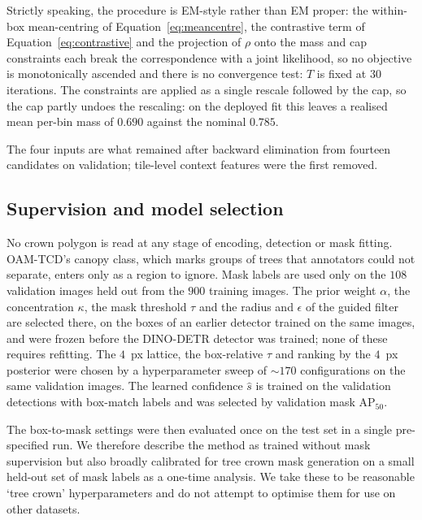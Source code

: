 \documentclass[remotesensing,article,submit,moreauthors]{Definitions/mdpi}
\begin{document}
Strictly speaking, the procedure is EM-style rather than EM proper: the within-box mean-centring of Equation~\eqref{eq:meancentre}, the contrastive term of Equation~\eqref{eq:contrastive} and the projection of $\rho$ onto the mass and cap constraints each break the correspondence with a joint likelihood, so no objective is monotonically ascended and there is no convergence test: $T$ is fixed at $30$ iterations.
The constraints are applied as a single rescale followed by the cap, so the cap partly undoes the rescaling: on the deployed fit this leaves a realised mean per-bin mass of $0.690$ against the nominal $0.785$.

The four inputs are what remained after backward elimination from fourteen candidates on validation; tile-level context features were the first removed.

\subsection{Supervision and model selection}
\label{app:selection}

No crown polygon is read at any stage of encoding, detection or mask fitting. OAM-TCD's canopy class, which marks groups of trees that annotators could not separate, enters only as a region to ignore. Mask labels are used only on the $108$ validation images held out from the $900$ training images. The prior weight $\alpha$, the concentration $\kappa$, the mask threshold $\tau$ and the radius and $\epsilon$ of the guided filter are selected there, on the boxes of an earlier detector trained on the same images, and were frozen before the DINO-DETR detector was trained; none of these requires refitting. The $4$~px lattice, the box-relative $\tau$ and ranking by the $4$~px posterior were chosen by a hyperparameter sweep of ${\sim}170$ configurations on the same validation images. The learned confidence $\hat s$ is trained on the validation detections with box-match labels and was selected by validation mask AP$_{50}$.

The box-to-mask settings were then evaluated once on the test set in a single pre-specified run. We therefore describe the method as trained without mask supervision but also broadly calibrated for tree crown mask generation on a small held-out set of mask labels as a one-time analysis. We take these to be reasonable `tree crown' hyperparameters and do not attempt to optimise them for use on other datasets.
\end{document}
